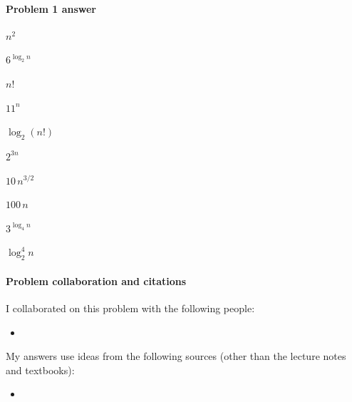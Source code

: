 \paragraph{Problem 1 answer}

\begin{enumerate}[label=]

\begin{blue}

  \item  \(n^2\)

  \item  \(6^{\log_2 n}\)

  \item \(n!\)

  \item \(11^n\)

  \item \(\log_2 (n!)  \)

  \item \(2^{3n}\)

  \item \(10\, n^{3/2}\)

  \item \(100\, n\)

  \item \(3^{\log_4 n}\)

  \item \(\log_2^4 n\)

\end{blue}

\end{enumerate}

\vfill

\paragraph{Problem  collaboration and citations}

I collaborated on this problem with the following people:
\begin{blue}
  \begin{itemize}
  \item \REPLACEME                    %
  \end{itemize}
\end{blue}

My answers use ideas from the following sources (other than the lecture notes and textbooks): 
\begin{blue}
  \begin{itemize}
  \item \REPLACEME                    %
  \end{itemize}
\end{blue}


